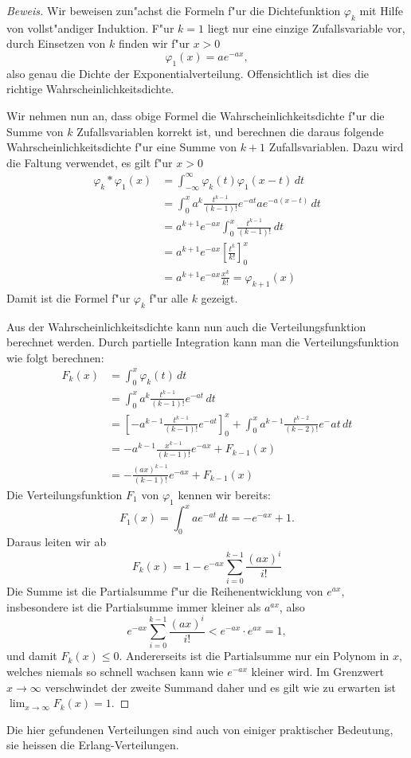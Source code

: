 \begin{proof}[Beweis]
Wir beweisen zun"achst die Formeln f"ur die Dichtefunktion $\varphi_k$ mit
Hilfe von vollst"andiger Induktion. F"ur $k=1$ liegt nur eine einzige
Zufallsvariable vor, durch Einsetzen von $k$ finden wir f"ur $x>0$
\[
\varphi_1(x)=ae^{-ax},
\]
also genau die Dichte der Exponentialverteilung. Offensichtlich ist dies
die richtige Wahrscheinlichkeitsdichte.

Wir nehmen nun an, dass obige Formel die Wahrscheinlichkeitsdichte f"ur die
Summe von $k$ Zufallsvariablen korrekt ist, und berechnen die daraus
folgende Wahrscheinlichkeitsdichte f"ur eine Summe von $k+1$ Zufallsvariablen.
Dazu wird die Faltung verwendet, es gilt f"ur $x>0$
\begin{align*}
\varphi_k*\varphi_1(x)
&=
\int_{-\infty}^{\infty}\varphi_k(t)\varphi_1(x-t)\,dt\\
&=\int_0^x a^k\frac{t^{k-1}}{(k-1)!}e^{-at}ae^{-a(x-t)}\,dt\\
&=a^{k+1}e^{-ax}\int_0^x \frac{t^{k-1}}{(k-1)!}\,dt\\
&=a^{k+1}e^{-ax}\left[\frac{t^k}{k!}\right]_0^x\\
&=a^{k+1}e^{-ax}\frac{x^k}{k!}=\varphi_{k+1}(x)
\end{align*}
Damit ist die Formel f"ur $\varphi_k$ f"ur alle $k$ gezeigt.

Aus der Wahrscheinlichkeitsdichte kann nun auch die Verteilungsfunktion
berechnet werden. Durch partielle Integration kann man die Verteilungsfunktion
wie folgt berechnen:
\begin{align*}
F_k(x)
&=\int_0^x\varphi_k(t)\,dt\\
&=\int_0^xa^k\frac{t^{k-1}}{(k-1)!}e^{-at}\,dt\\
&=\left[-a^{k-1}\frac{t^{k-1}}{(k-1)!}e^{-at}\right]_0^x+\int_0^xa^{k-1}\frac{t^{k-2}}{(k-2)!}e^-at\,dt\\
&=-a^{k-1}\frac{x^{k-1}}{(k-1)!}e^{-ax}+F_{k-1}(x)\\
&=-\frac{(ax)^{k-1}}{(k-1)!}e^{-ax}+F_{k-1}(x)
\end{align*}
Die Verteilungsfunktion $F_1$ von $\varphi_1$ kennen wir bereits:
\[
F_1(x)=\int_0^xae^{-at}\,dt=-e^{-ax}+1.
\]
Daraus leiten wir ab
\[
F_k(x)=1-e^{-ax}\sum_{i=0}^{k-1}\frac{(ax)^i}{i!}
\]
Die Summe ist die Partialsumme f"ur die Reihenentwicklung von $e^{ax}$,
insbesondere ist die Partialsumme immer kleiner als $a^{ax}$, also
\[
e^{-ax}\sum_{i=0}^{k-1}\frac{(ax)^i}{i!}<e^{-ax}\cdot e^{ax}=1,
\]
und damit $F_k(x) \le 0$. Andererseits ist die Partialsumme nur ein
Polynom in $x$, welches niemals so schnell wachsen kann wie $e^{-ax}$ kleiner
wird. Im Grenzwert $x\to\infty$ verschwindet der zweite Summand daher und
es gilt wie zu erwarten ist $\lim_{x\to\infty}F_k(x)=1$.
\end{proof}
Die hier gefundenen Verteilungen sind auch von einiger praktischer Bedeutung,
sie heissen die Erlang-Verteilungen.


